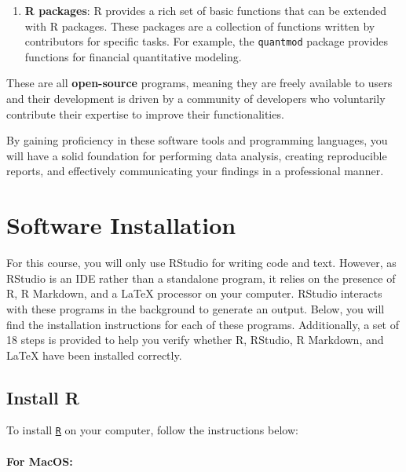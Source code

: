 \documentclass[
]{book}
\begin{document}
\begin{enumerate}
\item
  \textbf{R packages}: R provides a rich set of basic functions that can be extended with R packages. These packages are a collection of functions written by contributors for specific tasks. For example, the \texttt{quantmod} package provides functions for financial quantitative modeling.
\end{enumerate}

These are all \textbf{open-source} programs, meaning they are freely available to users and their development is driven by a community of developers who voluntarily contribute their expertise to improve their functionalities.

By gaining proficiency in these software tools and programming languages, you will have a solid foundation for performing data analysis, creating reproducible reports, and effectively communicating your findings in a professional manner.

\hypertarget{software-installation}{%
\chapter{Software Installation}\label{software-installation}}

For this course, you will only use RStudio for writing code and text. However, as RStudio is an IDE rather than a standalone program, it relies on the presence of R, R Markdown, and a LaTeX processor on your computer. RStudio interacts with these programs in the background to generate an output. Below, you will find the installation instructions for each of these programs. Additionally, a set of 18 steps is provided to help you verify whether R, RStudio, R Markdown, and LaTeX have been installed correctly.

\hypertarget{install-r}{%
\section{Install R}\label{install-r}}

To install \href{https://www.r-project.org/}{\texttt{R}} on your computer, follow the instructions below:

\hypertarget{for-macos}{%
\subsubsection*{For MacOS:}\label{for-macos}}
\end{document}
